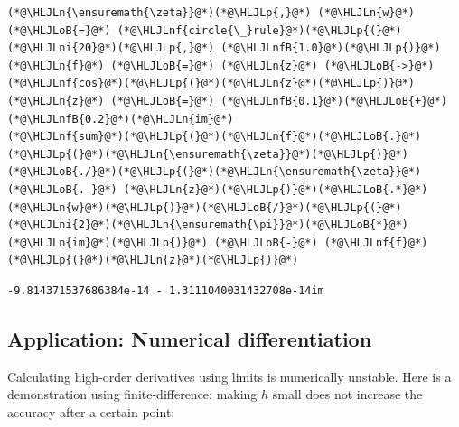 \documentclass[12pt,a4paper]{article}
\newcommand{\HLJLn}[1]{#1}
\newcommand{\HLJLnf}[1]{\textcolor[RGB]{66,102,213}{#1}}
\newcommand{\HLJLnfB}[1]{\textcolor[RGB]{59,151,46}{#1}}
\newcommand{\HLJLni}[1]{\textcolor[RGB]{59,151,46}{#1}}
\newcommand{\HLJLoB}[1]{\textcolor[RGB]{102,102,102}{\textbf{#1}}}
\newcommand{\HLJLp}[1]{#1}
\begin{document}
\begin{lstlisting}
(*@\HLJLn{\ensuremath{\zeta}}@*)(*@\HLJLp{,}@*) (*@\HLJLn{w}@*) (*@\HLJLoB{=}@*) (*@\HLJLnf{circle{\_}rule}@*)(*@\HLJLp{(}@*)(*@\HLJLni{20}@*)(*@\HLJLp{,}@*) (*@\HLJLnfB{1.0}@*)(*@\HLJLp{)}@*)
(*@\HLJLn{f}@*) (*@\HLJLoB{=}@*) (*@\HLJLn{z}@*) (*@\HLJLoB{->}@*) (*@\HLJLnf{cos}@*)(*@\HLJLp{(}@*)(*@\HLJLn{z}@*)(*@\HLJLp{)}@*)
(*@\HLJLn{z}@*) (*@\HLJLoB{=}@*) (*@\HLJLnfB{0.1}@*)(*@\HLJLoB{+}@*)(*@\HLJLnfB{0.2}@*)(*@\HLJLn{im}@*)
(*@\HLJLnf{sum}@*)(*@\HLJLp{(}@*)(*@\HLJLn{f}@*)(*@\HLJLoB{.}@*)(*@\HLJLp{(}@*)(*@\HLJLn{\ensuremath{\zeta}}@*)(*@\HLJLp{)}@*)(*@\HLJLoB{./}@*)(*@\HLJLp{(}@*)(*@\HLJLn{\ensuremath{\zeta}}@*) (*@\HLJLoB{.-}@*) (*@\HLJLn{z}@*)(*@\HLJLp{)}@*)(*@\HLJLoB{.*}@*)(*@\HLJLn{w}@*)(*@\HLJLp{)}@*)(*@\HLJLoB{/}@*)(*@\HLJLp{(}@*)(*@\HLJLni{2}@*)(*@\HLJLn{\ensuremath{\pi}}@*)(*@\HLJLoB{*}@*)(*@\HLJLn{im}@*)(*@\HLJLp{)}@*) (*@\HLJLoB{-}@*) (*@\HLJLnf{f}@*)(*@\HLJLp{(}@*)(*@\HLJLn{z}@*)(*@\HLJLp{)}@*)
\end{lstlisting}

\begin{lstlisting}
-9.814371537686384e-14 - 1.3111040031432708e-14im
\end{lstlisting}


\subsection{Application: Numerical differentiation}
Calculating high-order derivatives using limits is numerically unstable. Here is a demonstration using finite-difference:  making $h$ small does not increase the accuracy after a certain point:
\end{document}
